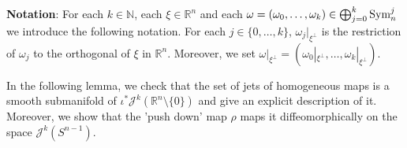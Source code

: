 \documentclass[10pt,twoside]{article}
\newcommand{\R}{\mathbb{R}}
\newcommand{\N}{\mathbb{N}}
\newcommand{\calJ}{\mathcal{J}}
\newcommand{\Rnzls}{\mathbb{R}^n\setminus\{0\}}
\newcommand{\Sym}{\textup{Sym}}
\newenvironment{notation}
{\vskip 2mm \textbf{Notation}:\vskip 2mm}{}
\numberwithin{theorem}{section}
\begin{document}
\begin{notation}
For each $k\in\N$, each $\xi\in\R^n$ and each $\omega=(\omega_0,\dots,\omega_k)\in\bigoplus_{j=0}^k\Sym_n^j$ we introduce the following notation. For each $j\in\{0,\dots,k\}$, $\omega_j|_{\xi^\perp}$ is the restriction of $\omega_j$ to the orthogonal of $\xi$ in $\R^n$. Moreover, we set $\omega|_{\xi^\perp}=(\omega_0|_{\xi^\perp},\dots,\omega_k|_{\xi^\perp})$.\\
\end{notation}

In the following lemma, we check that the set of jets of homogeneous maps is a smooth submanifold of $\iota^*\calJ^k\left(\Rnzls\right)$ and give an explicit description of it. Moreover, we show that the 'push down' map $\rho$ maps it diffeomorphically on the space $\calJ^k\left(S^{n-1}\right)$.
\end{document}
